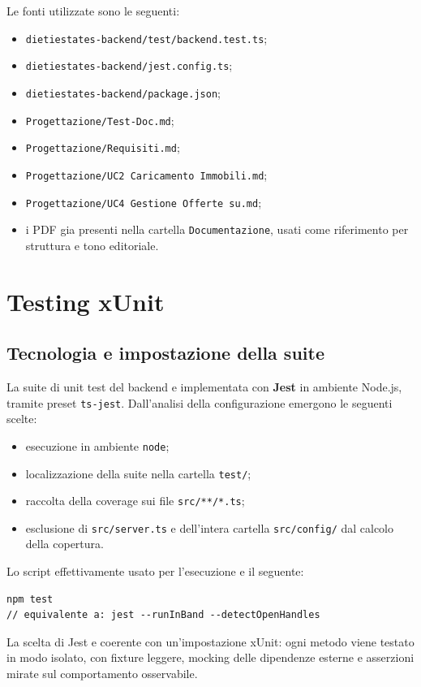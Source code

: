 \documentclass[a4paper,11pt]{article}
\begin{document}
Le fonti utilizzate sono le seguenti:
\begin{itemize}
  \item \texttt{dietiestates-backend/test/backend.test.ts};
  \item \texttt{dietiestates-backend/jest.config.ts};
  \item \texttt{dietiestates-backend/package.json};
  \item \texttt{Progettazione/Test-Doc.md};
  \item \texttt{Progettazione/Requisiti.md};
  \item \texttt{Progettazione/UC2 Caricamento Immobili.md};
  \item \texttt{Progettazione/UC4 Gestione Offerte su.md};
  \item i PDF gia presenti nella cartella \texttt{Documentazione}, usati come riferimento per struttura e tono editoriale.
\end{itemize}

\section{Testing xUnit}

\subsection{Tecnologia e impostazione della suite}
La suite di unit test del backend e implementata con \textbf{Jest} in ambiente Node.js, tramite preset \texttt{ts-jest}. Dall'analisi della configurazione emergono le seguenti scelte:
\begin{itemize}
  \item esecuzione in ambiente \texttt{node};
  \item localizzazione della suite nella cartella \texttt{test/};
  \item raccolta della coverage sui file \texttt{src/**/*.ts};
  \item esclusione di \texttt{src/server.ts} e dell'intera cartella \texttt{src/config/} dal calcolo della copertura.
\end{itemize}

Lo script effettivamente usato per l'esecuzione e il seguente:

\begin{lstlisting}[style=projectcode]
npm test
// equivalente a: jest --runInBand --detectOpenHandles
\end{lstlisting}

La scelta di Jest e coerente con un'impostazione xUnit: ogni metodo viene testato in modo isolato, con fixture leggere, mocking delle dipendenze esterne e asserzioni mirate sul comportamento osservabile.
\end{document}

